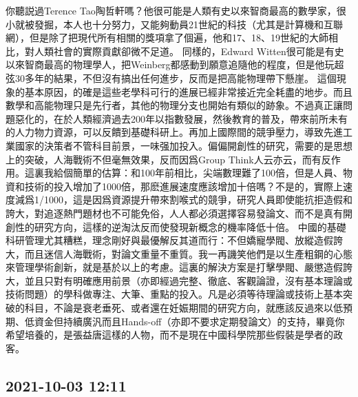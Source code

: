 \documentclass[twocolumn]{ctexart}
\begin{document}
你聽説過Terence Tao陶哲軒嗎？他很可能是人類有史以來智商最高的數學家，很小就被發掘，本人也十分努力，又能夠動員21世紀的科技（尤其是計算機和互聯網），但是除了把現代所有相關的獎項拿了個遍，他和17、18、19世紀的大師相比，對人類社會的實際貢獻卻微不足道。
同樣的，Edward Witten很可能是有史以來智商最高的物理學人，把Weinberg都感動到願意追隨他的程度，但是他玩超弦30多年的結果，不但沒有搞出任何進步，反而是把高能物理帶下懸崖。
這個現象的基本原因，的確是這些老學科可行的進展已經非常接近完全耗盡的地步。而且數學和高能物理只是先行者，其他的物理分支也開始有類似的跡象。不過真正讓問題惡化的，在於人類經濟過去200年以指數發展，然後教育的普及，帶來前所未有的人力物力資源，可以反饋到基礎科研上。再加上國際間的競爭壓力，導致先進工業國家的決策者不管科目前景，一味强加投入。偏偏開創性的研究，需要的是思想上的突破，人海戰術不但毫無效果，反而因爲Group Think人云亦云，而有反作用。這裏我給個簡單的估算：和100年前相比，尖端數理難了100倍，但是人員、物資和技術的投入增加了1000倍，那麽進展速度應該增加十倍嗎？不是的，實際上速度減爲1/1000，這是因爲資源提升帶來割喉式的競爭，研究人員即使能抗拒造假和誇大，對追逐熱門題材也不可能免俗，人人都必須選擇容易發論文、而不是真有開創性的研究方向，這樣的逆淘汰反而使發現新概念的機率降低十倍。
中國的基礎科研管理尤其糟糕，理念剛好與最優解反其道而行：不但嬌寵學閥、放縱造假誇大，而且迷信人海戰術，對論文重量不重質。我一再譏笑他們是以生產粗鋼的心態來管理學術創新，就是基於以上的考慮。這裏的解決方案是打擊學閥、嚴懲造假誇大，並且只對有明確應用前景（亦即經過完整、徹底、客觀論證，沒有基本理論或技術問題）的學科做專注、大筆、重點的投入。凡是必須等待理論或技術上基本突破的科目，不論是衰老垂死、或者還在妊娠期間的研究方向，就應該反過來以低預期、低資金但持續廣汎而且Hands-off（亦即不要求定期發論文）的支持，畢竟你希望培養的，是張益唐這樣的人物，而不是現在中國科學院那些假裝是學者的政客。
\subsection*{2021-10-03 12:11}
\end{document}
